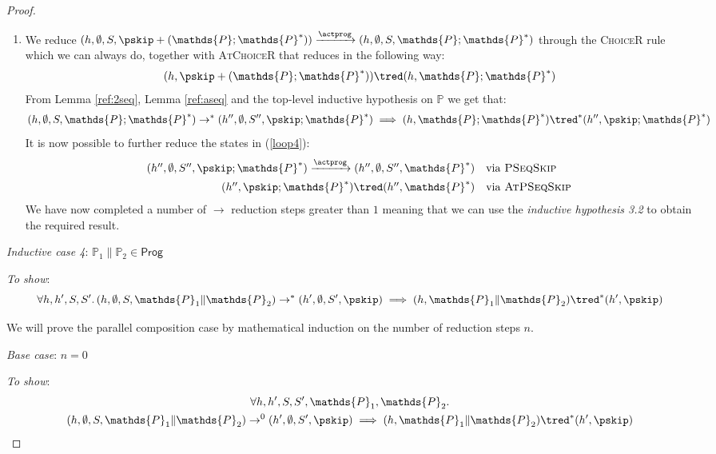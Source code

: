 \begin{thm}
{\begin{proof}
\begin{enumerate}
	\item We reduce $(h, \emptyset, S, \pskip + (\mathds{P} ; \mathds{P}^*)) \xrightarrow{\actprog} (h, \emptyset, S, \mathds{P} ; \mathds{P}^*)$ through the \textsc{ChoiceR} rule which we can always do, together with \textsc{AtChoiceR} that reduces in the following way:
	\[
		(h, \pskip + (\mathds{P} ; \mathds{P}^*)) \tred (h, \mathds{P} ; \mathds{P}^*)
	\]
	From Lemma \ref{ref:2seq}, Lemma \ref{ref:aseq} and the top-level inductive hypothesis on $\mathds{P}$ we get that:
	\begin{gather}
		\label{loop4}
		(h, \emptyset, S, \mathds{P} ; \mathds{P}^*) \rightarrow^* (h'', \emptyset, S'', \pskip ; \mathds{P}^*) \implies (h, \mathds{P} ; \mathds{P}^*) \tred^* (h'', \pskip ; \mathds{P}^*)
	\end{gather}
	It is now possible to further reduce the states in (\ref{loop4}):
	\[
		\begin{array}{r l}
			(h'', \emptyset, S'', \pskip ; \mathds{P}^*) \xrightarrow{\actprog} (h'', \emptyset, S'', \mathds{P}^*)
			&
			\text{via \textsc{PSeqSkip}}
			\\[0.5em]
			(h'', \pskip ; \mathds{P}^*) \tred (h'', \mathds{P}^*)
			&
			\text{via \textsc{AtPSeqSkip}}
		\end{array}
	\]
	We have now completed a number of $\rightarrow$ reduction steps greater than $1$ meaning that we can use the \textit{inductive hypothesis 3.2} to obtain the required result. \\
\end{enumerate}
\indline
\textit{Inductive case 4}: $\mathds{P}_1 \| \mathds{P}_2 \in \mathsf{Prog}$

\textit{To show}:
\[
	\forall h, h', S, S' \ldotp
	(h, \emptyset, S, \mathds{P}_1 \| \mathds{P}_2) \rightarrow^* (h', \emptyset, S', \pskip) \implies 
	(h, \mathds{P}_1 \| \mathds{P}_2 ) \tred^* (h', \pskip)
\]

We will prove the parallel composition case by mathematical induction on the number of reduction steps $n$.

\textit{Base case}: $n = 0$

\textit{To show}:
\begin{gather*}
	\forall h, h', S, S', \mathds{P}_1, \mathds{P}_2 \ldotp \\
	(h, \emptyset, S, \mathds{P}_1 \| \mathds{P}_2) \rightarrow^0 (h', \emptyset, S', \pskip)
	\implies
	(h, \mathds{P}_1 \| \mathds{P}_2) \tred^* (h', \pskip)
\end{gather*}


\end{proof}}
\end{thm}
